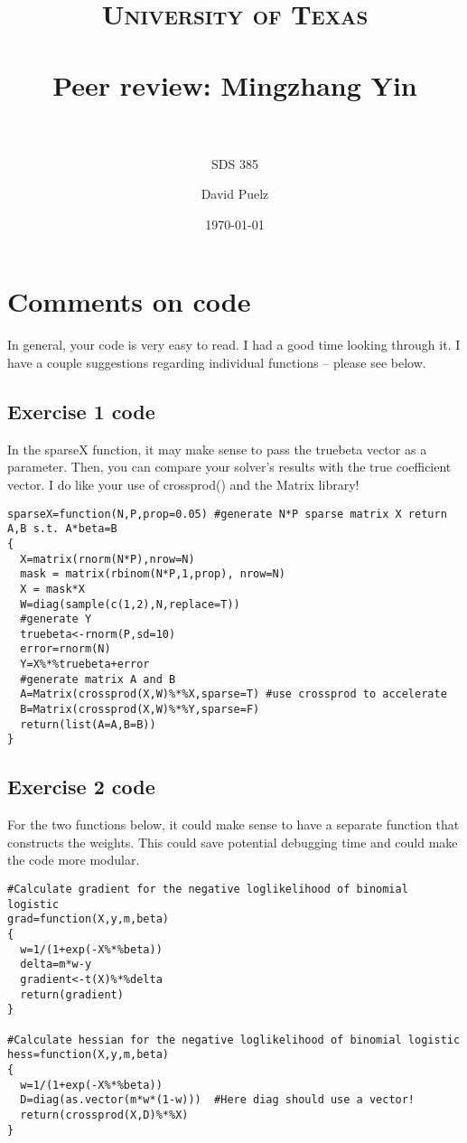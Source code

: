 \documentclass[paper=a4, fontsize=11pt]{scrartcl} %
\title{	
\normalfont \normalsize 
\textsc{University of Texas} \\ [25pt] %
\horrule{0.1pt} \\[.5cm] %
\huge Peer review: Mingzhang Yin \\ %
\horrule{.1pt} \\[0cm] %
}
\subtitle{SDS 385}
\author{David Puelz} %
\date{\normalsize\today} %
\numberwithin{equation}{section} %
\numberwithin{figure}{section} %
\numberwithin{table}{section} %
\begin{document}
\maketitle
\tableofcontents
\newpage



\section{Comments on code}

In general, your code is very easy to read.  I had a good time looking through it. I have a couple suggestions regarding individual functions -- please see below.

\subsection{Exercise 1 code}

In the sparseX function, it may make sense to pass the truebeta vector as a parameter.  Then, you can compare your solver's results with the true coefficient vector.  I do like your use of crossprod() and the Matrix library!

\begin{lstlisting}
sparseX=function(N,P,prop=0.05) #generate N*P sparse matrix X return A,B s.t. A*beta=B
{
  X=matrix(rnorm(N*P),nrow=N)
  mask = matrix(rbinom(N*P,1,prop), nrow=N)
  X = mask*X
  W=diag(sample(c(1,2),N,replace=T))
  #generate Y
  truebeta<-rnorm(P,sd=10)
  error=rnorm(N)
  Y=X%*%truebeta+error
  #generate matrix A and B
  A=Matrix(crossprod(X,W)%*%X,sparse=T) #use crossprod to accelerate
  B=Matrix(crossprod(X,W)%*%Y,sparse=F)
  return(list(A=A,B=B))
}	
\end{lstlisting}

\subsection{Exercise 2 code}

For the two functions below, it could make sense to have a separate function that constructs the weights.  This could save potential debugging time and could make the code more modular.

\begin{lstlisting}
#Calculate gradient for the negative loglikelihood of binomial logistic
grad=function(X,y,m,beta)
{
  w=1/(1+exp(-X%*%beta))
  delta=m*w-y
  gradient<-t(X)%*%delta
  return(gradient)
}

#Calculate hessian for the negative loglikelihood of binomial logistic
hess=function(X,y,m,beta)
{
  w=1/(1+exp(-X%*%beta))
  D=diag(as.vector(m*w*(1-w)))  #Here diag should use a vector!
  return(crossprod(X,D)%*%X)
}
\end{lstlisting}
\end{document}
